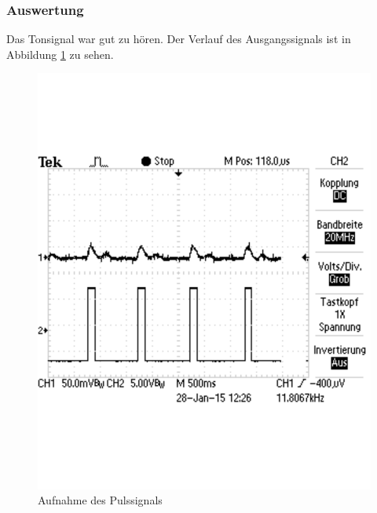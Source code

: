 \documentclass[12pt,a4paper]{article}
\begin{document}
\subsubsection*{Auswertung}

Das Tonsignal war gut zu hören. Der Verlauf des Ausgangssignals ist in Abbildung \ref{fig:5_3} zu sehen.

\begin{figure}[H] 
	\centering
	\includegraphics[trim = 0mm 50mm 0mm 50mm, clip, scale = 0.4]{5_3.pdf}
	\caption[Aufnahme des Pulssignals]{Aufnahme des Pulssignals}
	\label{fig:5_3}
\end{figure}
\end{document}
